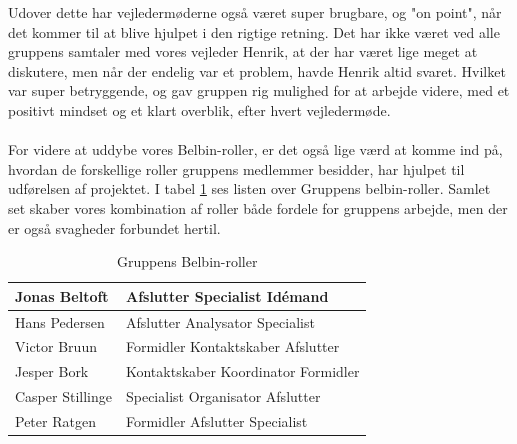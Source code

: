 Udover dette har vejledermøderne også været super brugbare, og "on point", når det kommer til at blive hjulpet i den rigtige retning. Det har ikke været ved alle gruppens samtaler med vores vejleder Henrik, at der har været lige meget at diskutere, men når der endelig var et problem, havde Henrik altid svaret. Hvilket var super betryggende, og gav gruppen rig mulighed for at arbejde videre, med et positivt mindset og et klart overblik, efter hvert vejledermøde.
\\\\
For videre at uddybe vores Belbin-roller, er det også lige værd at komme ind på, hvordan de forskellige roller gruppens medlemmer besidder, har hjulpet til udførelsen af projektet. I tabel \ref{tab:Belbin_roller} ses listen over Gruppens belbin-roller. Samlet set skaber vores kombination af roller både fordele for gruppens arbejde, men der er også svagheder forbundet hertil.
        \begin{table}[H]
        \centering
        \begin{tabular}{|p{30mm}|p{50mm}|}
        \hline
            Jonas Beltoft & Afslutter\newline
                            Specialist \newline
                            Idémand
        \\ \hline
            Hans Pedersen & Afslutter \newline
                            Analysator \newline
                            Specialist
        \\ \hline
            Victor Bruun & Formidler \newline
                           Kontaktskaber \newline
                           Afslutter
        \\ \hline
            Jesper Bork & Kontaktskaber \newline
                          Koordinator \newline
                          Formidler
        \\ \hline
            Casper Stillinge & Specialist \newline
                               Organisator \newline
                               Afslutter
        \\ \hline
            Peter Ratgen & Formidler \newline
                           Afslutter \newline
                           Specialist
        \\ \hline
        \end{tabular}
            \caption{Gruppens Belbin-roller}
            \label{tab:Belbin_roller}
        \end{table}
